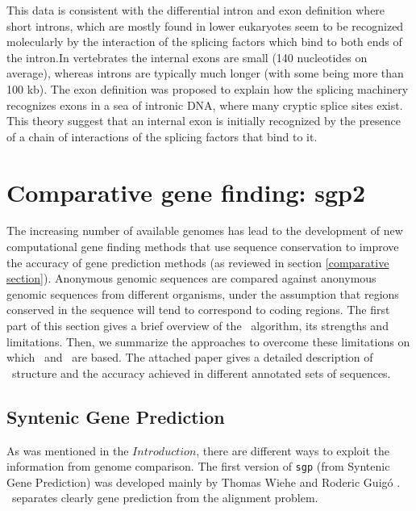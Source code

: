 This data is consistent with the differential intron and exon
definition where short introns, which are mostly found in lower
eukaryotes seem to be recognized molecularly by the interaction of the
splicing factors which bind to both ends of the intron.In vertebrates
the internal exons are small (140 nucleotides on average), whereas
introns are typically much longer (with some being more than 100
kb). The exon definition was proposed to explain how the splicing
machinery recognizes exons in a sea of intronic DNA, where many
cryptic splice sites exist. This theory suggest that an internal exon
is initially recognized by the presence of a chain of interactions of
the splicing factors that bind to it.







\chapter{Comparative gene finding: sgp2}

The increasing number of available genomes has lead to the development
of new computational gene finding methods that use sequence
conservation to improve the accuracy of gene prediction methods (as
reviewed in section \ref{comparative section}). Anonymous genomic
sequences are compared against anonymous genomic sequences from
different organisms, under the assumption that regions conserved in
the sequence will tend to correspond to coding regions. The first part
of this section gives a brief overview of the \sgpo\ algorithm, its
strengths and limitations. Then, we summarize the approaches to
overcome these limitations on which \twinscan\ and \sgp\ are
based. The attached paper gives a detailed description of
\sgp\ structure and the accuracy achieved in different annotated sets
of sequences.


\section{Syntenic Gene Prediction}

As was mentioned in the $Introduction$, there are different ways to
exploit the information from genome comparison. The first version of
\texttt{sgp} (from Syntenic Gene Prediction) was developed mainly by
Thomas Wiehe and Roderic Guig\'o \citep{wiehe:2001a}. \sgpo\ separates
clearly gene prediction from the alignment problem. 


